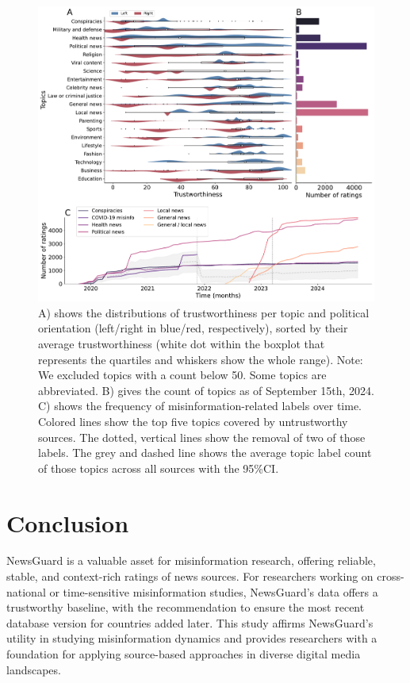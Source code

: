 \documentclass{article}
\begin{document}
\begin{figure}[!h]
    \centering
    \includegraphics[width=\textwidth]{figures/topics_panel.pdf}
    \caption{A) shows the distributions of trustworthiness per topic and political orientation (left/right in blue/red, respectively), sorted by their average trustworthiness (white dot within the boxplot that represents the quartiles and whiskers show the whole range). 
    Note: We excluded topics with a count below 50. Some topics are abbreviated. B) gives the count of topics as of September 15th, 2024.
    C) shows the frequency of misinformation-related labels over time.
    Colored lines show the top five topics covered by untrustworthy sources. 
    The dotted, vertical lines show the removal of two of those labels.
    The grey and dashed line shows the average topic label count of those topics across all sources with the 95\%CI.}
    \label{fig:topics_panel}
\end{figure}

\section{Conclusion}
NewsGuard is a valuable asset for misinformation research, offering reliable, stable, and context-rich ratings of news sources. 
For researchers working on cross-national or time-sensitive misinformation studies, NewsGuard's data offers a trustworthy baseline, with the recommendation to ensure the most recent database version for countries added later. 
This study affirms NewsGuard’s utility in studying misinformation dynamics and provides researchers with a foundation for applying source-based approaches in diverse digital media landscapes.
\end{document}
